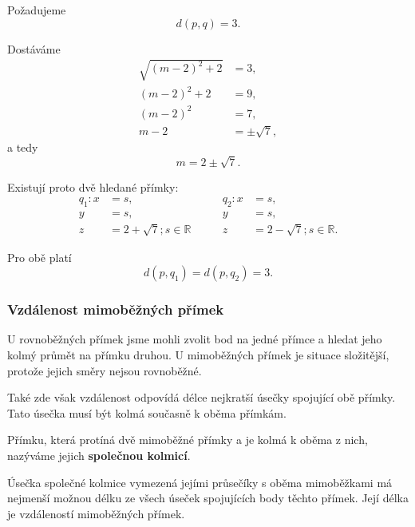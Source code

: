 \begin{example}
    Požadujeme
    \[
        d(p,q)=3.
    \]

    Dostáváme
    \begin{align*}
        \sqrt{(m-2)^2+2}&=3,\\
        (m-2)^2+2&=9,\\
        (m-2)^2&=7,\\
        m-2&=\pm\sqrt7,
    \end{align*}
    a tedy
    \[
        m=2\pm\sqrt7.
    \]

    Existují proto dvě hledané přímky:
    \[
        \begin{aligned}
            q_1: x&=s,\\
                 y&=s,\\
                 z&=2+\sqrt7; s\in\mathbb{R}
        \end{aligned}
        \qquad
        \begin{aligned}
            q_2: x&=s,\\
                 y&=s,\\
                 z&=2-\sqrt7; s\in\mathbb{R}.
        \end{aligned}
    \]

    Pro obě platí
    \[
        d(p,q_1)=d(p,q_2)=3.
    \]
\end{example}



\subsubsection{Vzdálenost mimoběžných přímek}
\label{subsubsec:Distance_skew_lines_space}

U rovnoběžných přímek jsme mohli zvolit bod na jedné přímce
a hledat jeho kolmý průmět na přímku druhou. U mimoběžných přímek
je situace složitější, protože jejich směry nejsou rovnoběžné.

Také zde však vzdálenost odpovídá délce nejkratší úsečky spojující
obě přímky. Tato úsečka musí být kolmá současně k oběma přímkám.

\begin{definition}
    \label{def:Common_perpendicular_skew_lines}

    Přímku, která protíná dvě mimoběžné přímky a je kolmá
    k oběma z nich, nazýváme jejich \textbf{společnou kolmicí}.

    Úsečka společné kolmice vymezená jejími průsečíky s oběma
    mimoběžkami má nejmenší možnou délku ze všech úseček spojujících
    body těchto přímek. Její délka je vzdáleností mimoběžných přímek.
\end{definition}

